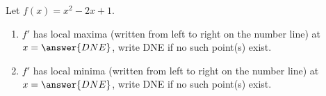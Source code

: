 \documentclass{ximera}
\author{Gregory Hartman \and Matthew Carr}
\begin{document}
\begin{exercise}






Let $f(x)=x^2-2x+1$.
\begin{enumerate}
\item		$f'$ has local maxima (written from left to right on the number line) at $x=\answer{DNE}$, write DNE if no such point(s) exist.
\item		$f'$ has local minima (written from left to right on the number line) at $x=\answer{DNE}$, write DNE if no such point(s) exist.
\end{enumerate}

\end{exercise}
\end{document}
